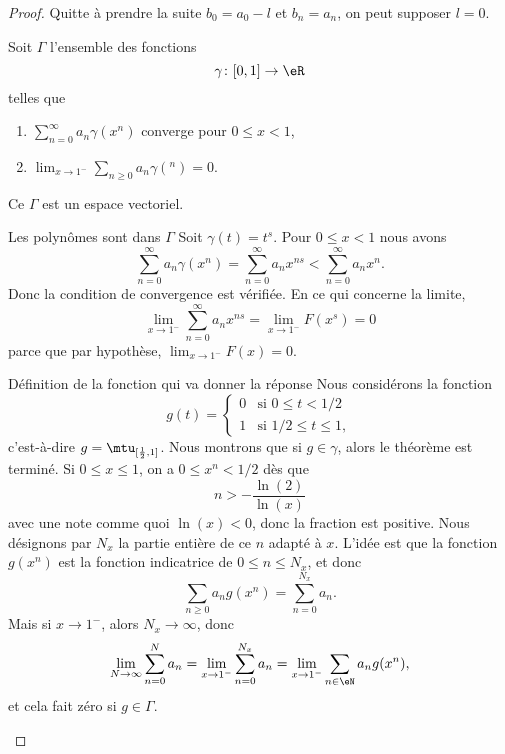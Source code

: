 \begin{proof}
	Quitte à prendre la suite \( b_0=a_0-l\) et \( b_n=a_n\), on peut supposer \( l=0\).

	Soit \( \Gamma\) l'ensemble des fonctions
	\begin{equation}
		\gamma\colon \mathopen[ 0 , 1 \mathclose]\to \eR
	\end{equation}
	telles que
	\begin{enumerate}
		\item
		      \( \sum_{n=0}^{\infty}a_n\gamma(x^n)\) converge pour \( 0\leq x<1\),
		\item
		      \( \lim_{x\to 1^-} \sum_{n\geq 0}a_n\gamma(^n)=0\).
	\end{enumerate}
	Ce \( \Gamma\) est un espace vectoriel.
	\begin{subproof}
		\item[Les polynômes sont dans \( \Gamma\)]
		Soit \( \gamma(t)=t^s\). Pour \( 0\leq x<1\) nous avons
		\begin{equation}
			\sum_{n=0}^{\infty}a_n\gamma(x^n)=\sum_{n=0}^{\infty}a_nx^{ns}<\sum_{n=0}^{\infty}a_nx^n.
		\end{equation}
		Donc la condition de convergence est vérifiée. En ce qui concerne la limite,
		\begin{equation}
			\lim_{x\to 1^-} \sum_{n=0}^{\infty}a_nx^{ns}=\lim_{x\to 1^-} F(x^s)=0
		\end{equation}
		parce que par hypothèse, \( \lim_{x\to 1^-} F(x)=0\).

		\item[Définition de la fonction qui va donner la réponse]
		Nous considérons la fonction
		\begin{equation}
			g(t)=\begin{cases}
				0 & \text{si } 0\leq t<1/2      \\
				1 & \text{si } 1/2\leq t\leq 1,
			\end{cases}
		\end{equation}
		c'est-à-dire \( g=\mtu_{\mathopen[ \frac{ 1 }{2} , 1 \mathclose]}\). Nous montrons que si \( g\in \gamma\), alors le théorème est terminé. Si \( 0\leq x\leq 1\), on a \( 0\leq x^n<1/2\) dès que
		\begin{equation}
			n>-\frac{ \ln(2) }{ \ln(x) }
		\end{equation}
		avec une note comme quoi \( \ln(x)<0\), donc la fraction est positive. Nous désignons par \( N_x\) la partie entière de ce \( n\) adapté à \( x\). L'idée est que la fonction  \( g(x^n)\) est la fonction indicatrice de \(0 \leq n\leq N_x\), et donc
		\begin{equation}
			\sum_{n\geq 0}a_ng(x^n)=\sum_{n=0}^{N_x}a_n.
		\end{equation}
		Mais si \( x\to 1^-\), alors \( N_x\to \infty\), donc
		\begin{equation}
			\lim_{N\to \infty} \sum_{n=0}^Na_n=\lim_{x\to 1^-} \sum_{n=0}^{N_x}a_n=\lim_{x\to 1^-} \sum_{n\in \eN}a_ng(x^n),
		\end{equation}
		et cela fait zéro si \( g\in \Gamma\).


\end{subproof}
\end{proof}
